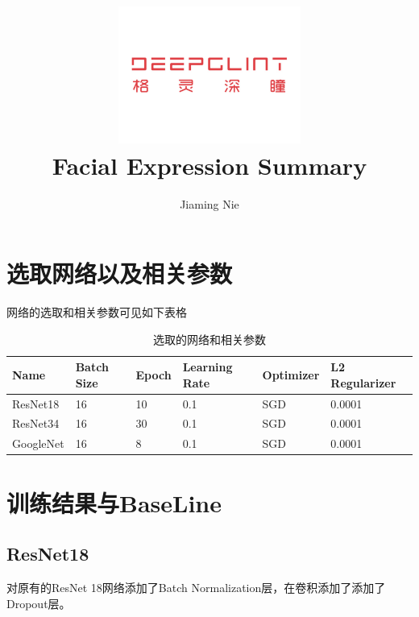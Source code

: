 \documentclass[11pt, a4paper]{article}
\title{\includegraphics[width=0.45\textwidth]{dg}
        \\Facial Expression Summary   }          %
\author{Jiaming Nie}                    %
\begin{document}
\begin{titlepage}
	
\maketitle
{}

\thispagestyle{empty}  %

\end{titlepage}




\begin{CJK}{UTF8}{gbsn}

\section{选取网络以及相关参数}
网络的选取和相关参数可见如下表格

\begin{table}[htbp] 
	\begin{center}
		\caption{选取的网络和相关参数}
		\begin{tabular}{| l | l | l | l | l | l |}  \hline
	  Name & Batch Size & Epoch & Learning Rate & Optimizer & L2 Regularizer \\ \hline
	  ResNet18 & 16     & 10     & 0.1  &SGD & 0.0001\\ \hline
	  ResNet34 &  16   & 30   & 0.1  & SGD & 0.0001 \\ \hline
	  GoogleNet &  16 & 8  & 0.1  & SGD  & 0.0001 \\ \hline
		\end{tabular}
		
		\label{tab:kf_meaning2}
	\end{center}
\end{table}	

\section{训练结果与BaseLine}

\subsection{ResNet18}
对原有的ResNet 18网络添加了Batch Normalization层，在卷积添加了添加了Dropout层。


\end{CJK}
\end{document}
